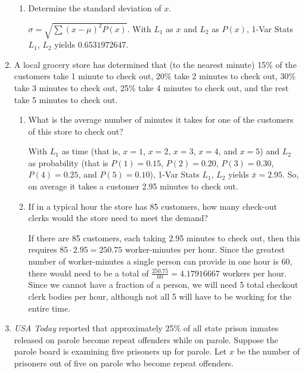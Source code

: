 \documentclass{article}
\newcommand{\answer}[1]{\color{white}#1}
\begin{document}
\begin{enumerate}
\begin{enumerate}
	\item Determine the standard deviation of $x$. 
	
	{\answer $\sigma = \sqrt{\sum(x-\mu)^2P(x)}$.  With $L_1$ as $x$ and $L_2$ as $P(x)$, 1-Var Stats $L_1$, $L_2$ yields $0.6531972647$.
	} 
	
	\end{enumerate}
	
\item A local grocery store has determined that (to the nearest minute) 15\% of the customers take 1 minute to check out, 20\% take 2 minutes to check out, 30\% take 3 minutes to check out, 25\% take 4 minutes to check out, and the rest take 5 minutes to check out.

	\begin{enumerate}
	
	\item What is the average number of minutes it takes for one of the customers of this store to check out? 
	
	{\answer With $L_1$ as time (that is, $x=1$, $x=2$, $x=3$, $x=4$, and $x=5$) and $L_2$ as probability (that is $P(1) = 0.15$, $P(2) = 0.20$, $P(3) = 0.30$, $P(4) = 0.25$, and $P(5) = 0.10$), 1-Var Stats $L_1$, $L_2$ yields $\bar{x} = 2.95$.  So, on average it takes a customer 2.95 minutes to check out.
	} 
	
	\item If in a typical hour the store has 85 customers, how many check-out clerks would the store need to meet the demand? 
	
	{\answer If there are 85 customers, each taking 2.95 minutes to check out, then this requires $85\cdot 2.95 = 250.75$ worker-minutes per hour.  Since the greatest number of worker-minutes a single person can provide in one hour is 60, there would need to be a total of $\frac{250.75}{60} = 4.17916667$ workers per hour.  Since we cannot have a fraction of a person, we will need 5 total checkout clerk bodies per hour, although not all 5 will have to be working for the entire time.
	} 
	
	\end{enumerate}

\newpage

\item {\em USA Today} reported that approximately 25\% of all state prison inmates released on parole become repeat offenders while on parole.  Suppose the parole board is examining five prisoners up for parole.  Let $x$ be the number of prisoners out of five on parole who become repeat offenders.


\end{enumerate}
\end{document}
